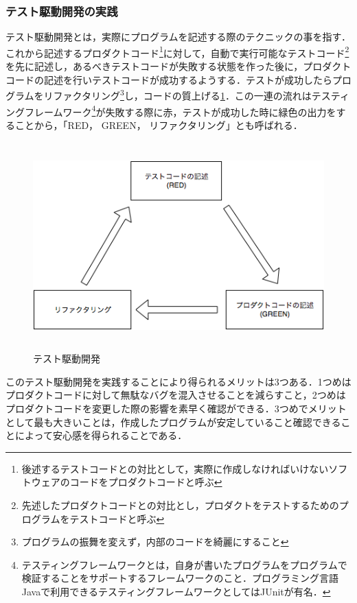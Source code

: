 \subsubsection{テスト駆動開発の実践}

テスト駆動開発とは，実際にプログラムを記述する際のテクニックの事を指す．これから記述するプロダクトコード\footnote{後述するテストコードとの対比として，実際に作成しなければいけないソフトウェアのコードをプロダクトコードと呼ぶ}に対して，自動で実行可能なテストコード\footnote{先述したプロダクトコードとの対比とし，プロダクトをテストするためのプログラムをテストコードと呼ぶ}を先に記述し，あるべきテストコードが失敗する状態を作った後に，プロダクトコードの記述を行いテストコードが成功するようする．テストが成功したらプログラムをリファクタリング\footnote{プログラムの振舞を変えず，内部のコードを綺麗にすること}し，コードの質上げる\ref{fig:tdd}．この一連の流れはテスティングフレームワーク\footnote{テスティングフレームワークとは，自身が書いたプログラムをプログラムで検証することをサポートするフレームワークのこと．プログラミング言語Javaで利用できるテスティングフレームワークとしてはJUnitが有名．}が失敗する際に赤，テストが成功した時に緑色の出力をすることから，「RED， GREEN， リファクタリング」とも呼ばれる．

\begin{figure}[H]
\centering
\includegraphics[height=8cm]{./assets/images/tdd.png}
\caption{テスト駆動開発}
\label{fig:tdd}
\end{figure}


このテスト駆動開発を実践することにより得られるメリットは3つある．1つめはプロダクトコードに対して無駄なバグを混入させることを減らすこと，2つめはプロダクトコードを変更した際の影響を素早く確認ができる．3つめでメリットとして最も大きいことは，作成したプログラムが安定していること確認できることによって安心感を得られることである．

